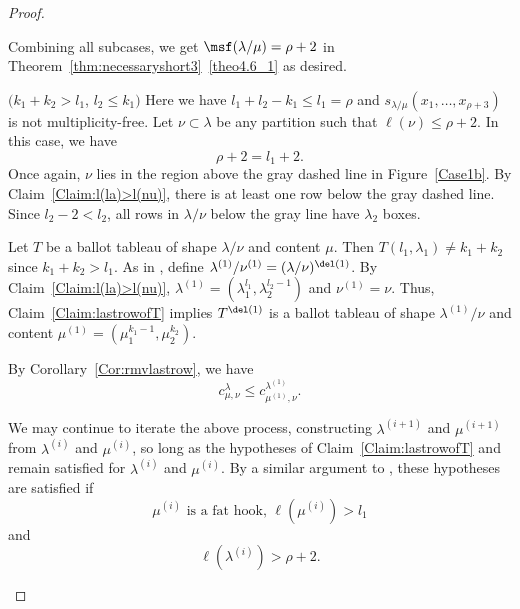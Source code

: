 \begin{proof}
\begin{Case}
Combining all subcases, we get ${\msf }(\lambda/\mu) = \rho+2$ in Theorem~\ref{thm:necessaryshort3}~\ref{theo4.6_1} as desired.
\end{Case}

\begin{Case}
{ $(k_1+k_2 > l_1$, $l_2 \leq k_1)$} 
Here we have $l_1+l_2-k_1 \leq l_1 = \rho$ and $s_{\lambda/\mu}(x_1,\ldots,x_{\rho+3})$ is not multiplicity-free. Let $\nu\subset \lambda$ be any partition such that $\ell(\nu)\leq \rho+2$. In this case, we have
\begin{equation}
\label{eq:case1.3rho}
\rho+2 = l_1+2.
\end{equation}
Once again, $\nu$ lies in the region above the gray dashed line in Figure~\ref{Case1b}. By Claim~\ref{Claim:l(la)>l(nu)}, there is at least one row below the gray dashed line. Since $l_2-2 < l_2$, all rows in $\lambda/\nu$ below the gray line have $\lambda_2$ boxes.

Let $T$ be a ballot tableau of shape $\lambda/\nu$ and content $\mu$. Then $T(l_1,\lambda_1)\neq k_1+k_2$ since $k_1+k_2 > l_1$. As in , define $\lambda^{(1)}/ \nu^{(1)} = (\lambda / \nu)^{\del (1)}$. By Claim~\ref{Claim:l(la)>l(nu)}, $\lambda^{(1)} = (\lambda_1^{l_1},\lambda_2^{l_2-1})$ and $\nu^{(1)} = \nu$. Thus, Claim~\ref{Claim:lastrowofT} implies $T^{\del (1)}$ is a ballot tableau of shape $\lambda^{(1)}/\nu$ and content $\mu^{(1)} = (\mu_1^{k_1-1},\mu_2^{k_2})$.

By Corollary~\ref{Cor:rmvlastrow}, we have
\begin{equation}
\label{eq:firstiterationbound1.3}
c^{\lambda}_{\mu,\nu} \leq c^{\lambda^{(1)}}_{\mu^{(1)},\nu}.
\end{equation}

We may continue to iterate the above process, constructing $\lambda^{(i+1)}$ and $\mu^{(i+1)}$ from $\lambda^{(i)}$ and $\mu^{(i)}$, so long as the hypotheses of Claim~\ref{Claim:lastrowofT} and  remain satisfied for $\lambda^{(i)}$ and $\mu^{(i)}$. By a similar argument to , these hypotheses are satisfied if
\begin{equation}\label{eqn:condition11}
 \mu^{(i)}\text{ is a fat hook, }\ell(\mu^{(i)}) > l_1
\end{equation}
and 
\begin{equation}\label{eqn:condition1b}
 \ell(\lambda^{(i)}) > \rho+2.
\end{equation}


\end{Case}
\end{proof}
